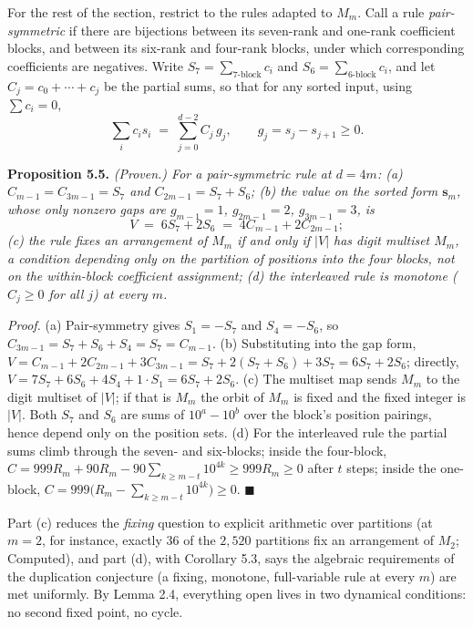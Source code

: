 \documentclass[11pt,letterpaper]{article}
\theoremstyle{paperstyle}
\theoremstyle{paperstyledef}
\theoremstyle{paperstylerem}
\begin{document}
For the rest of the section, restrict to the rules adapted to \(M_m\). Call a rule \emph{pair-symmetric} if there are bijections between its seven-rank and one-rank coefficient blocks, and between its six-rank and four-rank blocks, under which corresponding coefficients are negatives. Write \(S_7 = \sum_{\text{7-block}} c_i\) and \(S_6 = \sum_{\text{6-block}} c_i\), and let \(C_j = c_0 + \cdots + c_j\) be the partial sums, so that for any sorted input, using \(\sum c_i = 0\), \[\sum_i c_i s_i \;=\; \sum_{j=0}^{d-2} C_j\, g_j, \qquad g_j = s_j - s_{j+1} \geq 0.\]

\textbf{Proposition 5.5.} \emph{(Proven.) For a pair-symmetric rule at \(d = 4m\): (a) \(C_{m-1} = C_{3m-1} = S_7\) and \(C_{2m-1} = S_7 + S_6\); (b) the value on the sorted form \(\mathbf{s}_m\), whose only nonzero gaps are \(g_{m-1} = 1\), \(g_{2m-1} = 2\), \(g_{3m-1} = 3\), is} \[V \;=\; 6 S_7 + 2 S_6 \;=\; 4C_{m-1} + 2C_{2m-1};\] \emph{(c) the rule fixes an arrangement of \(M_m\) if and only if \(|V|\) has digit multiset \(M_m\), a condition depending only on the partition of positions into the four blocks, not on the within-block coefficient assignment; (d) the interleaved rule is monotone (\(C_j \geq 0\) for all \(j\)) at every \(m\).}

\emph{Proof.} (a) Pair-symmetry gives \(S_1 = -S_7\) and \(S_4 = -S_6\), so \(C_{3m-1} = S_7 + S_6 + S_4 = S_7 = C_{m-1}\). (b) Substituting into the gap form, \(V = C_{m-1} + 2C_{2m-1} + 3C_{3m-1} = S_7 + 2(S_7 + S_6) + 3S_7 = 6S_7 + 2S_6\); directly, \(V = 7S_7 + 6S_6 + 4S_4 + 1\cdot S_1 = 6S_7 + 2S_6\). (c) The multiset map sends \(M_m\) to the digit multiset of \(|V|\); if that is \(M_m\) the orbit of \(M_m\) is fixed and the fixed integer is \(|V|\). Both \(S_7\) and \(S_6\) are sums of \(10^a - 10^b\) over the block's position pairings, hence depend only on the position sets. (d) For the interleaved rule the partial sums climb through the seven- and six-blocks; inside the four-block, \(C = 999 R_m + 90 R_m - 90 \sum_{k \geq m-t} 10^{4k} \geq 999 R_m \geq 0\) after \(t\) steps; inside the one-block, \(C = 999\bigl(R_m - \sum_{k \geq m-t} 10^{4k}\bigr) \geq 0\). \(\blacksquare\)

Part (c) reduces the \emph{fixing} question to explicit arithmetic over partitions (at \(m = 2\), for instance, exactly \(36\) of the \(2{,}520\) partitions fix an arrangement of \(M_2\); Computed), and part (d), with Corollary 5.3, says the algebraic requirements of the duplication conjecture (a fixing, monotone, full-variable rule at every \(m\)) are met uniformly. By Lemma 2.4, everything open lives in two dynamical conditions: no second fixed point, no cycle.
\end{document}
